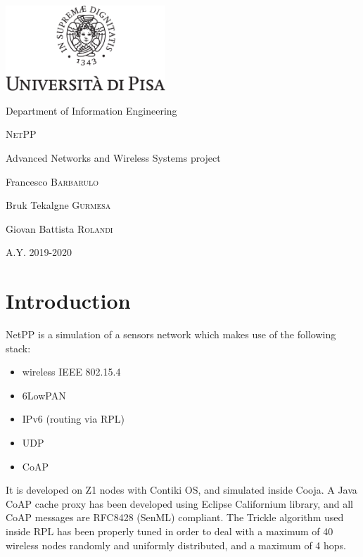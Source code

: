 \documentclass[a4paper,12pt]{article}
\newcommand{\projectname}{NetPP}
\begin{document}

{
  \begin{titlepage}
  	\centering
  	\includegraphics[width=6cm]{img/unipi.pdf}\par
    \vspace{1.5cm}
    {\Large Department of Information Engineering \par}
  	\vspace{1.5cm}
  	{\huge\textsc{\projectname{}}\par}
    \vspace{0.5cm}
    {\Large Advanced Networks and Wireless Systems project \par}
  	\vspace{2cm}
  	Francesco \textsc{Barbarulo}\par
  	Bruk Tekalgne \textsc{Gurmesa}\par
    Giovan Battista \textsc{Rolandi}

  	\vfill

  	{\large A.Y. 2019-2020\par}
  \end{titlepage}
}

\tableofcontents  %


\section{Introduction}
\projectname{} is a simulation of a sensors network which makes use of the following stack:
\begin{itemize}
  \item wireless IEEE 802.15.4
  \item 6LowPAN
  \item IPv6 (routing via RPL)
  \item UDP
  \item CoAP
\end{itemize}

It is developed on Z1 nodes with Contiki OS, and simulated inside Cooja.
A Java CoAP cache proxy has been developed using Eclipse Californium library, and all CoAP messages are RFC8428 (SenML) compliant.
The Trickle algorithm used inside RPL has been properly tuned in order to deal with a maximum of 40 wireless nodes randomly and uniformly distributed, and a maximum of 4 hops. %
\end{document}
